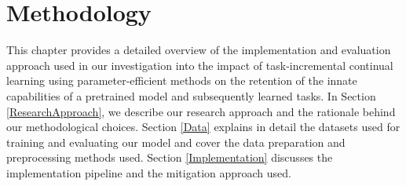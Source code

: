 
\chapter{Methodology} %

\label{Methodology} %

This chapter provides a detailed overview of the implementation and evaluation approach used in our investigation into the impact of task-incremental continual learning using parameter-efficient methods on the retention of the innate capabilities of a pretrained model and subsequently learned tasks. In Section \ref{ResearchApproach}, we describe our research approach and the rationale behind our methodological choices. Section \ref{Data} explains in detail %
the datasets used for training and evaluating our model and cover the data preparation and preprocessing methods used. Section \ref{Implementation} discusses the implementation pipeline and the mitigation approach used.
